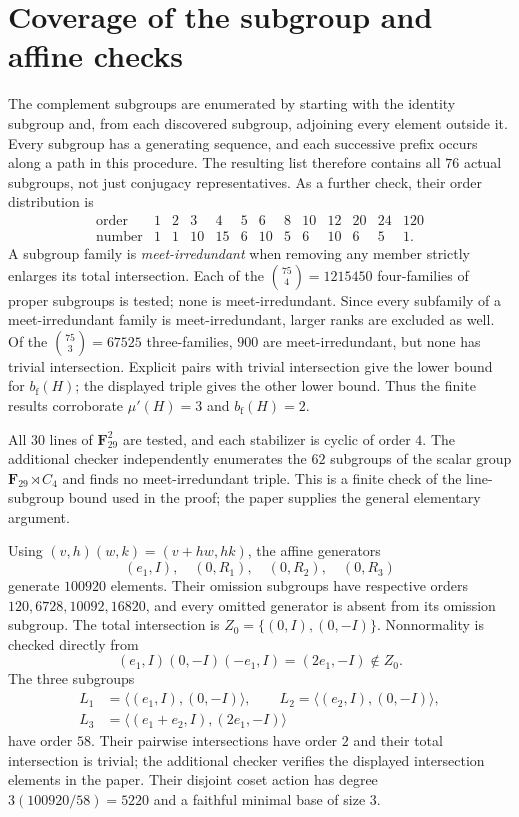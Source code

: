 \documentclass[11pt]{amsart}
\newcommand{\F}{\mathbf F}
\newcommand{\mup}{\mu'}
\newcommand{\bfth}{b_{\mathrm f}}
\begin{document}
\section{Coverage of the subgroup and affine checks}

The complement subgroups are enumerated by starting with the identity
subgroup and, from each discovered subgroup, adjoining every element outside
it. Every subgroup has a generating sequence, and each successive prefix
occurs along a path in this procedure. The resulting list therefore contains
all $76$ actual subgroups, not just conjugacy representatives. As a further
check, their order distribution is
\[
\begin{array}{c|rrrrrrrrrrrr}
 \text{order}&1&2&3&4&5&6&8&10&12&20&24&120\\\hline
 \text{number}&1&1&10&15&6&10&5&6&10&6&5&1.
\end{array}
\]
A subgroup family is \emph{meet-irredundant} when removing any member
strictly enlarges its total intersection. Each of the
$\binom{75}{4}=1215450$ four-families of proper subgroups is tested;
none is meet-irredundant. Since every subfamily of a meet-irredundant family
is meet-irredundant, larger ranks are excluded as well. Of the
$\binom{75}{3}=67525$ three-families, $900$ are meet-irredundant, but none
has trivial intersection. Explicit pairs with trivial intersection give
the lower bound for $\bfth(H)$; the displayed triple gives the other lower
bound. Thus the finite results corroborate $\mup(H)=3$ and $\bfth(H)=2$.

All $30$ lines of $\F_{29}^2$ are tested, and each stabilizer is cyclic of
order $4$. The additional checker independently enumerates the $62$ subgroups
of the scalar group $\F_{29}\rtimes C_4$ and finds no meet-irredundant triple.
This is a finite check of the line-subgroup bound used in the proof; the
paper supplies the general elementary argument.

Using $(v,h)(w,k)=(v+hw,hk)$, the affine generators
\[
 (e_1,I),\quad (0,R_1),\quad (0,R_2),\quad (0,R_3)
\]
generate $100920$ elements. Their omission subgroups have respective orders
$120,6728,10092,16820$, and every omitted generator is absent from its
omission subgroup. The total intersection is
$Z_0=\{(0,I),(0,-I)\}$. Nonnormality is checked directly from
\[
 (e_1,I)(0,-I)(-e_1,I)=(2e_1,-I)\notin Z_0.
\]
The three subgroups
\[
\begin{split}
 L_1&=\langle(e_1,I),(0,-I)\rangle,\qquad
 L_2=\langle(e_2,I),(0,-I)\rangle,\\
 L_3&=\langle(e_1+e_2,I),(2e_1,-I)\rangle
\end{split}
\]
have order $58$. Their pairwise intersections have order $2$ and their total
intersection is trivial; the additional checker verifies the displayed
intersection elements in the paper. Their disjoint coset action has degree
$3(100920/58)=5220$ and a faithful minimal base of size $3$.
\end{document}
